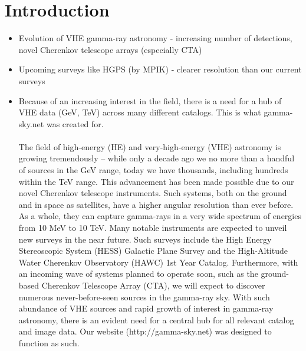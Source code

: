 \section{Introduction}

\begin{itemize}

\item Evolution of VHE gamma-ray astronomy - increasing number of detections, novel Cherenkov telescope arrays (especially CTA)

\item Upcoming surveys like HGPS (by MPIK) - clearer resolution than our current surveys

\item Because of an increasing interest in the field, there is a need for a hub of VHE data (GeV, TeV) across many different catalogs.
This is what gamma-sky.net was created for.

\pagebreak

\paragraph{}        The field of high-energy (HE) and very-high-energy (VHE) astronomy is growing tremendously – while only
        a decade ago we no more than a handful of sources in the GeV range, today we have thousands, including
        hundreds within the TeV range. This advancement has been made possible due to our novel Cherenkov telescope instruments.
        Such systems, both on the ground and in space as satellites, have a higher angular resolution than ever before.
        As a whole, they can capture gamma-rays in a very wide spectrum of energies from 10 MeV to 10 TeV.
        Many notable instruments are expected to unveil new surveys in the near future. Such surveys include the
        High Energy Stereoscopic System (HESS) Galactic Plane Survey and the High-Altitude Water Cherenkov Observatory (HAWC) 1st Year Catalog.
        Furthermore, with an incoming wave of systems planned to operate soon, such as the ground-based Cherenkov Telescope Array (CTA),
        we will expect to discover numerous never-before-seen sources in the gamma-ray sky. With such abundance of VHE sources and
        rapid growth of interest in gamma-ray astronomy, there is an evident need for a central hub for all relevant catalog and image data.
        Our website (http://gamma-sky.net) was designed to function as such. \par

\end{itemize}
